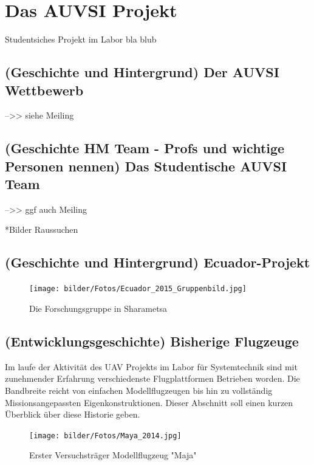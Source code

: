\chapter{Das AUVSI Projekt}\label{cha:Das AUVSI Projekt}

Studentsiches Projekt im Labor  bla blub

\section{(Geschichte und Hintergrund) Der AUVSI Wettbewerb}

\cite{AUVSIrules}

\cite{Meiling}

-->> siehe Meiling 

\section{(Geschichte HM Team - Profs und wichtige Personen nennen) Das Studentische AUVSI Team}

-->> ggf auch Meiling

*Bilder Raussuchen

\section{(Geschichte und Hintergrund) Ecuador-Projekt}

\cite{Niclas}

\begin{figure}[H]
\centering
\texttt{[image: bilder/Fotos/Ecuador\_2015\_Gruppenbild.jpg]} 
\caption{Die Forschungsgruppe in Sharametsa} 
\label{Die Forschungsgruppe in Sharametsa}
\end{figure}


\section{(Entwicklungsgeschichte) Bisherige Flugzeuge}

Im laufe der Aktivität des UAV Projekts im Labor für Systemtechnik sind mit zunehmender Erfahrung verschiedenste Flugplattformen Betrieben worden. Die Bandbreite reicht von einfachen Modellflugzeugen bis hin zu vollständig Missionsangepassten Eigenkonstruktionen.
Dieser Abschnitt soll einen kurzen Überblick über diese Historie geben.

\begin{figure}[H]
\centering
\texttt{[image: bilder/Fotos/Maya\_2014.jpg]} 
\caption{Erster Versuchsträger Modellflugzeug "Maja"} 
\label{Erster Versuchsträger Modellflugzeug "Maja"}
\end{figure}

